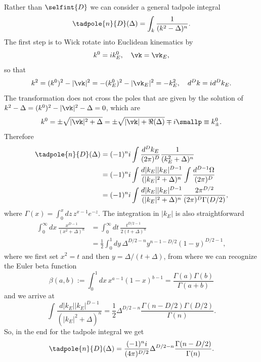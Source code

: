 Rather than $\selfint{D}$ we can consider a general tadpole integral 
\begin{equation}
\label{eq: tadpole integral}
    \tadpole{n}{D}(\Delta) = \int _k \frac{1}{(k^2 - \Delta)^n}.
\end{equation}
The first step is to Wick rotate into Euclidean kinematics by
\begin{equation}
    k^0 = ik_E^0,\quad \vk = \vk_E,
\end{equation}
so that 
\begin{equation}
    k^2 = (k^0)^2 - |\vk|^2 = -(k_E^0)^2 - |\vk_E|^2 = -k_E^2,\quad d^Dk = id^Dk_E.
\end{equation}
The transformation does not cross the poles that are given by the solution of $k^2 - \Delta = (k^0)^2 - |\vk|^2 - \Delta = 0$, which are
\begin{equation}
    k^0 = \pm\sqrt{|\vk|^2 + \Delta} = \pm\sqrt{|\vk| + \Re{(\Delta)}} \mp i\smallp \equiv k_\pm^0.
\end{equation}
Therefore
\begin{equation}
    \begin{split}
        \tadpole{n}{D}(\Delta) &= (-1)^ni\int\frac{d^Dk_E}{(2\pi)^D}\frac{1}{(k_E^2 + \Delta)^n} \\
        &= (-1)^ni\int\frac{d|k_E||k_E|^{D - 1}}{(|k_E|^2 + \Delta)^n}\int\frac{d^{D-1}\Omega}{(2\pi)^D} \\
        &= (-1)^ni\int\frac{d|k_E||k_E|^{D - 1}}{(|k_E|^2 + \Delta)^n}\frac{2\pi^{D/2}}{(2\pi)^D\Gamma(D/2)},
    \end{split}
\end{equation}
where $\Gamma(x) = \int_0^x dz\,z^{x-1}e^{-z}$. The integration in $|k_E|$ is also straightforward 
\begin{equation}
    \begin{split}
        \int_0^\infty dx\,\frac{x^{D-1}}{(x^2 + \Delta)^n} &= \int_0^\infty dt\,\frac{t^{D/2 - 1}}{2(t + \Delta)^n} \\
        &= \frac{1}{2}\int_0^1 dy\,\Delta^{D/2 - n}y^{n - 1 - D/2}(1 - y)^{D/2 - 1},
    \end{split}
\end{equation}
where we first set $x^2 = t$ and then $y = \Delta/(t + \Delta)$, from where we can recognize the Euler beta function 
\begin{equation}
    \beta(a,b) := \int_0^1 dx\,x^{a-1}(1-x)^{b-1} = \frac{\Gamma(a)\Gamma(b)}{\Gamma(a+b)}
\end{equation}
and we arrive at
\begin{equation}
    \int\frac{d|k_E||k_E|^{D - 1}}{(|k_E|^2 + \Delta)^n} = \frac{1}{2}\Delta^{D/2 - n}\frac{\Gamma(n - D/2)\Gamma(D/2)}{\Gamma(n)}.
\end{equation}
So, in the end for the tadpole integral we get
\begin{equation}
    \tadpole{n}{D}(\Delta) = \frac{(-1)^ni}{(4\pi)^{D/2}}\Delta^{D/2 - n}\frac{\Gamma(n - D/2)}{\Gamma(n)}.
\end{equation}

